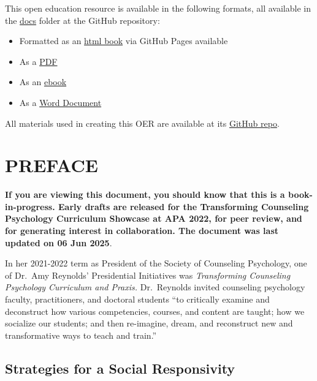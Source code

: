 \documentclass[
  11pt,
]{book}
\providecommand{\tightlist}{%
  \setlength{\itemsep}{0pt}\setlength{\parskip}{0pt}}
\begin{document}
This open education resource is available in the following formats, all available in the \href{https://github.com/lhbikos/TransformingResearchMethods/tree/main/docs}{docs} folder at the GitHub repository:

\begin{itemize}
\tightlist
\item
  Formatted as an \href{https://lhbikos.github.io/TransformingResearchMethods/}{html book} via GitHub Pages available
\item
  As a \href{https://github.com/lhbikos/TransformingResearchMethods/blob/main/docs/TransformingResearchMethods.pdf}{PDF}
\item
  As an \href{https://github.com/lhbikos/TransformingResearchMethods/blob/main/docs/TransformingResearchMethods.epub}{ebook}
\item
  As a \href{https://github.com/lhbikos/TransformingResearchMethods/blob/main/docs/TransformingResearchMethods.docx}{Word Document}
\end{itemize}

All materials used in creating this OER are available at its \href{https://github.com/lhbikos/TransformingResearchMethods}{GitHub repo}.

\chapter*{PREFACE}\label{preface}


\textbf{If you are viewing this document, you should know that this is a book-in-progress. Early drafts are released for the Transforming Counseling Psychology Curriculum Showcase at APA 2022, for peer review, and for generating interest in collaboration. The document was last updated on 06 Jun 2025}.

In her 2021-2022 term as President of the Society of Counseling Psychology, one of Dr.~Amy Reynolds' Presidential Initiatives was \emph{Transforming Counseling Psychology Curriculum and Praxis.} Dr.~Reynolds invited counseling psychology faculty, practitioners, and doctoral students ``to critically examine and deconstruct how various competencies, courses, and content are taught; how we socialize our students; and then re-imagine, dream, and reconstruct new and transformative ways to teach and train.''

\section*{Strategies for a Social Responsivity}\label{strategies-for-a-social-responsivity}
\end{document}
